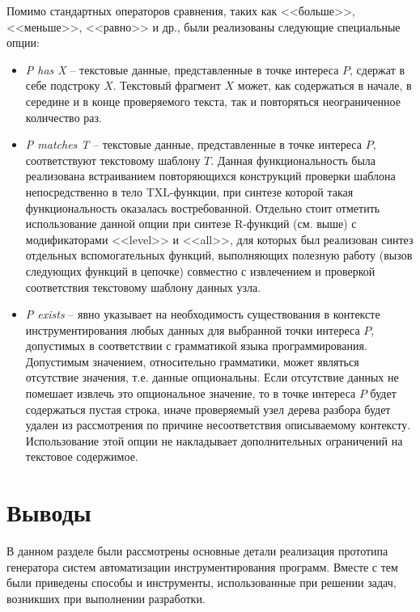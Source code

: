 Помимо стандартных операторов сравнения, таких как <<больше>>, <<меньше>>, <<равно>> и др., были реализованы следующие специальные опции:
\begin{itemize}[noitemsep]
  \item \textit{P has X} --
  текстовые данные, представленные в точке интереса $P$, сдержат в себе подстроку $X$.
  Текстовый фрагмент $X$ может, как содержаться в начале, в середине и в конце проверяемого текста, так и повторяться неограниченное количество раз.

  \item \textit{P matches T} --
  текстовые данные, представленные в точке интереса $P$, соответствуют текстовому шаблону $T$.
  Данная функциональность была реализована встраиванием повторяющихся конструкций проверки шаблона непосредственно в тело TXL-функции, при синтезе которой такая функциональность оказалась востребованной.
  Отдельно стоит отметить использование данной опции при синтезе R-функций (см. выше) с модификаторами <<level>> и <<all>>, для которых был реализован синтез отдельных вспомогательных функций, выполняющих полезную работу (вызов следующих функций в цепочке) совместно с извлечением и проверкой соответствия текстовому шаблону данных узла.

  \item \textit{P exists} --
  явно указывает на необходимость существования в контексте инструментирования любых данных для выбранной точки интереса $P$, допустимых в соответствии с грамматикой языка программирования.
  Допустимым значением, относительно грамматики, может являться отсутствие значения, т.е. данные опциональны.
  Если отсутствие данных не помешает извлечь это опциональное значение, то в точке интереса $P$ будет содержаться пустая строка, иначе проверяемый узел дерева разбора будет удален из рассмотрения по причине несоответствия описываемому контексту. 
  Использование этой опции не накладывает дополнительных ограничений на текстовое содержимое.
\end{itemize}

\section{Выводы}

В данном разделе были рассмотрены основные детали реализация прототипа генератора систем автоматизации инструментирования программ.
Вместе с тем были приведены способы и инструменты, использованные при решении задач, возникших при выполнении разработки.
